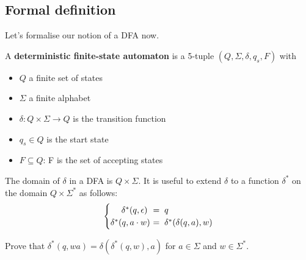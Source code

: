 \subsection{Formal definition}
Let's formalise our notion of a DFA now.

\begin{definition} \label{dfadef}
A {\bf deterministic finite-state automaton} is a 5-tuple
$(Q,\Sigma,\delta,q_s,F)$ with
\begin{itemize}
	\item $Q$ a finite set of states
	\item $\Sigma$ a finite alphabet
	\item $\delta: Q \times \Sigma \to Q$ is the transition function
	\item $q_s \in Q$ is the start state
	\item $F \subseteq Q$: F is the set of accepting states
\end{itemize}
\newpage
The domain of $\delta$ in a DFA is $Q \times \Sigma$. It is useful to extend
$\delta$ to a function $\delta^*$ on the domain $Q \times \Sigma^*$ as follows:
\begin{equation*}\begin{cases}
\;\quad\delta^*(q,\epsilon)\hspace{-0.5em}\! &=\; q \\
\delta^*(q,a \cdot w) \hspace{-0.5em}\! &=\; \delta^*(\delta(q,a),w)
\end{cases}
\end{equation*}
\end{definition}

\begin{exercise}
Prove that $\delta^*(q,wa) = \delta(\delta^*(q,w),a)$ for $a \in \Sigma$ and $w \in \Sigma^*$.
\end{exercise}


%  

